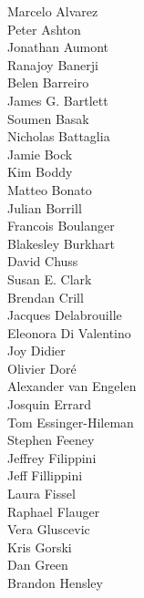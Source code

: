 \documentclass[PICOReport.tex]{subfiles}
\begin{document}
\footnotesize {

\begin{multicols}{4}
Marcelo Alvarez                 \\	
Peter Ashton                    \\	
Jonathan Aumont                 \\	
Ranajoy Banerji                 \\	
Belen Barreiro                  \\	
James G. Bartlett               \\	
Soumen Basak                    \\	
Nicholas Battaglia              \\	
Jamie Bock                      \\	
Kim Boddy                       \\	
Matteo Bonato                   \\	
Julian Borrill                  \\	
Francois Boulanger              \\	
Blakesley Burkhart              \\	
David Chuss                     \\	
Susan E. Clark                  \\	
Brendan Crill                   \\	
Jacques Delabrouille            \\	
Eleonora Di Valentino           \\	
Joy Didier                      \\	
Olivier Dor\'e                  \\	
Alexander van Engelen           \\	
Josquin Errard                  \\	
Tom Essinger-Hileman            \\	
Stephen Feeney                  \\	
Jeffrey Filippini               \\	
Jeff Fillippini                 \\	
Laura Fissel                    \\	
Raphael Flauger                 \\	
Vera Gluscevic                  \\	
Kris Gorski                     \\	
Dan Green                       \\	
Brandon Hensley                 \\	

\end{multicols}}
\end{document}
